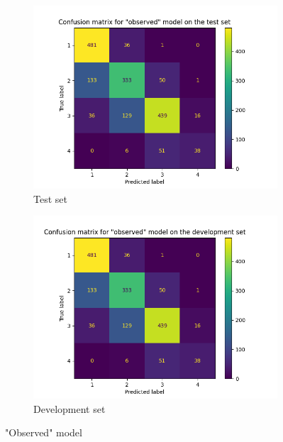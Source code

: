 \documentclass{article}
\begin{document}
\begin{appendices}
	\begin{figure}[h]
		\centering
		\begin{subfigure}[t]{0.49\textwidth}
			\centering
			\includegraphics[width=\textwidth]{sais_confusion_matrix_observed_test.png}
			\caption{Test set}
		\end{subfigure}
		\hfil
		\begin{subfigure}[t]{0.49\textwidth}
			\centering
			\includegraphics[width=\textwidth]{sais_confusion_matrix_observed_development.png}
			\caption{Development set}
		\end{subfigure}
		\caption{"Observed" model}
	\end{figure}


\end{appendices}
\end{document}

